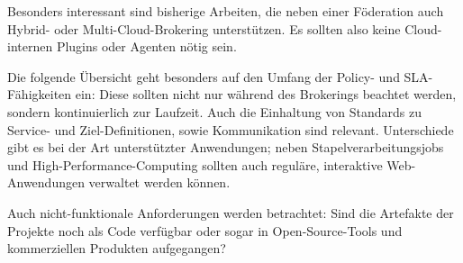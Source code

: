 Besonders interessant sind bisherige Arbeiten, die neben einer Föderation auch Hybrid- oder Multi-Cloud-Brokering unterstützen. Es sollten also keine Cloud-internen Plugins oder Agenten nötig sein.

Die folgende Übersicht geht besonders auf den Umfang der Policy- und SLA-Fähigkeiten ein: Diese sollten nicht nur während des Brokerings beachtet werden, sondern kontinuierlich zur Laufzeit. Auch die Einhaltung von Standards zu Service- und Ziel-Definitionen, sowie Kommunikation sind relevant. Unterschiede gibt es bei der Art unterstützter Anwendungen; neben Stapelverarbeitungsjobs und High-Performance-Computing sollten auch reguläre, interaktive Web-Anwendungen verwaltet werden können. 

Auch nicht-funktionale Anforderungen werden betrachtet: Sind die Artefakte der Projekte noch als Code verfügbar oder sogar in Open-Source-Tools und kommerziellen Produkten aufgegangen?


